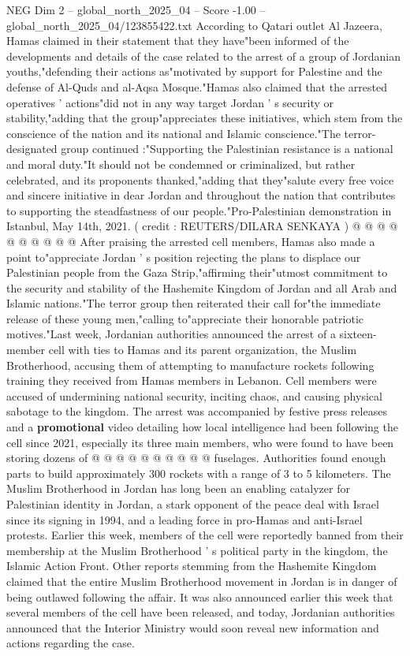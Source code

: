 \begin{textsample}{NEG Dim 2 – global\_north\_2025\_04 – Score -1.00 – global\_north\_2025\_04/123855422.txt}  \label{ex:f2_neg_120}
According to Qatari outlet Al Jazeera, Hamas claimed in their statement that they have"been informed of the developments and details of the case related to the arrest of a group of Jordanian youths,"defending their actions as"motivated by support for Palestine and the defense of Al-Quds and al-Aqsa Mosque."Hamas also claimed that the arrested operatives ' actions"did not in any way target Jordan ' s security or stability,"adding that the group"appreciates these initiatives, which stem from the conscience of the nation and its national and Islamic conscience."The terror-designated group continued :"Supporting the Palestinian resistance is a national and moral duty."It should not be condemned or criminalized, but rather celebrated, and its proponents thanked,"adding that they"salute every free voice and sincere initiative in dear Jordan and throughout the nation that contributes to supporting the steadfastness of our people."Pro-Palestinian demonstration in Istanbul, May 14th, 2021. ( credit : REUTERS/DILARA SENKAYA ) @ @ @ @ @ @ @ @ @ @ After praising the arrested cell members, Hamas also made a point to"appreciate Jordan ' s position rejecting the plans to displace our Palestinian people from the Gaza Strip,"affirming their"utmost commitment to the security and stability of the Hashemite Kingdom of Jordan and all Arab and Islamic nations."The terror group then reiterated their call for"the immediate release of these young men,"calling to"appreciate their honorable patriotic motives."Last week, Jordanian authorities announced the arrest of a sixteen-member cell with ties to Hamas and its parent organization, the Muslim Brotherhood, accusing them of attempting to manufacture rockets following training they received from Hamas members in Lebanon.
Cell members were accused of undermining national security, inciting chaos, and causing physical sabotage to the kingdom.
The arrest was accompanied by festive press releases and a \textbf{promotional} video detailing how local intelligence had been following the cell since 2021, especially its three main members, who were found to have been storing dozens of @ @ @ @ @ @ @ @ @ @ fuselages.
Authorities found enough parts to build approximately 300 rockets with a range of 3 to 5 kilometers.
The Muslim Brotherhood in Jordan has long been an enabling catalyzer for Palestinian identity in Jordan, a stark opponent of the peace deal with Israel since its signing in 1994, and a leading force in pro-Hamas and anti-Israel protests.
Earlier this week, members of the cell were reportedly banned from their membership at the Muslim Brotherhood ' s political party in the kingdom, the Islamic Action Front.
Other reports stemming from the Hashemite Kingdom claimed that the entire Muslim Brotherhood movement in Jordan is in danger of being outlawed following the affair.
It was also announced earlier this week that several members of the cell have been released, and today, Jordanian authorities announced that the Interior Ministry would soon reveal new information and actions regarding the case.

\end{textsample}
